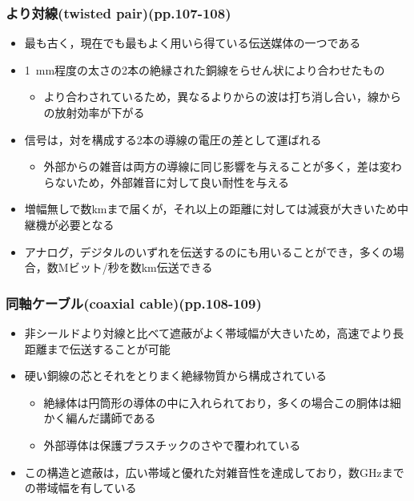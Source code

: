 \documentclass[a4paper]{ltjsarticle}
\begin{document}
		\subsubsection{より対線(twisted pair)(pp.107-108)}
			\begin{itemize}
				\item 最も古く，現在でも最もよく用いら得ている伝送媒体の一つである
				\item \SI{1}{mm}程度の太さの2本の絶縁された銅線をらせん状により合わせたもの
				\begin{itemize}
					\item より合わされているため，異なるよりからの波は打ち消し合い，線からの放射効率が下がる
				\end{itemize}
				\item 信号は，対を構成する2本の導線の電圧の差として運ばれる
				\begin{itemize}
					\item 外部からの雑音は両方の導線に同じ影響を与えることが多く，差は変わらないため，外部雑音に対して良い耐性を与える
				\end{itemize}
				\item 増幅無しで数kmまで届くが，それ以上の距離に対しては減衰が大きいため中継機が必要となる
				\item アナログ，デジタルのいずれを伝送するのにも用いることができ，多くの場合，数Mビット/秒を数km伝送できる
			\end{itemize}
		\subsubsection{同軸ケーブル(coaxial cable)(pp.108-109)}
			\begin{itemize}
				\item 非シールドより対線と比べて遮蔽がよく帯域幅が大きいため，高速でより長距離まで伝送することが可能
				\item 硬い銅線の芯とそれをとりまく絶縁物質から構成されている
				\begin{itemize}
					\item 絶縁体は円筒形の導体の中に入れられており，多くの場合この胴体は細かく編んだ講師である
					\item 外部導体は保護プラスチックのさやで覆われている
				\end{itemize}
				\item この構造と遮蔽は，広い帯域と優れた対雑音性を達成しており，数GHzまでの帯域幅を有している
			\end{itemize}
\end{document}
